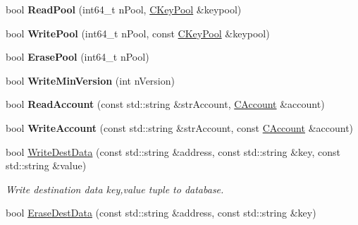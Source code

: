 \begin{DoxyCompactItemize}
\item 
\mbox{\label{class_c_wallet_d_b_a6a03927cf247314ccd9b285139de0bd1}} 
bool {\bfseries Read\+Pool} (int64\+\_\+t n\+Pool, \mbox{\hyperlink{class_c_key_pool}{C\+Key\+Pool}} \&keypool)
\item 
\mbox{\label{class_c_wallet_d_b_ad43630ad28a68c3e8b1a633f09aa0964}} 
bool {\bfseries Write\+Pool} (int64\+\_\+t n\+Pool, const \mbox{\hyperlink{class_c_key_pool}{C\+Key\+Pool}} \&keypool)
\item 
\mbox{\label{class_c_wallet_d_b_ac78d839fbda5164c4134ab67911139ca}} 
bool {\bfseries Erase\+Pool} (int64\+\_\+t n\+Pool)
\item 
\mbox{\label{class_c_wallet_d_b_ab008b6c6e09a60a988cac6e1a9e11886}} 
bool {\bfseries Write\+Min\+Version} (int n\+Version)
\item 
\mbox{\label{class_c_wallet_d_b_afa8d9d374072629b360adb49b9bdd584}} 
bool {\bfseries Read\+Account} (const std\+::string \&str\+Account, \mbox{\hyperlink{class_c_account}{C\+Account}} \&account)
\item 
\mbox{\label{class_c_wallet_d_b_afef640a4990f74fd5af7178c99415cf3}} 
bool {\bfseries Write\+Account} (const std\+::string \&str\+Account, const \mbox{\hyperlink{class_c_account}{C\+Account}} \&account)
\item 
\mbox{\label{class_c_wallet_d_b_af0de4949373dc3f0063db673fd8b24aa}} 
bool \mbox{\hyperlink{class_c_wallet_d_b_af0de4949373dc3f0063db673fd8b24aa}{Write\+Dest\+Data}} (const std\+::string \&address, const std\+::string \&key, const std\+::string \&value)
\begin{DoxyCompactList}\small\item\em Write destination data key,value tuple to database. \end{DoxyCompactList}\item 
\mbox{\label{class_c_wallet_d_b_a0403a98efe565020f8804eefbc808d90}} 
bool \mbox{\hyperlink{class_c_wallet_d_b_a0403a98efe565020f8804eefbc808d90}{Erase\+Dest\+Data}} (const std\+::string \&address, const std\+::string \&key)

\end{DoxyCompactItemize}
